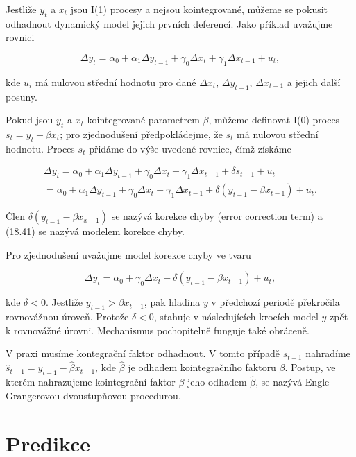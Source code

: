 Jestliže $y_t$ a $x_t$ jsou I(1) procesy a nejsou kointegrované, můžeme se pokusit odhadnout dynamický model 
jejich prvních deferencí. Jako příklad uvažujme rovnici

\begin{equation}
\Delta y_t = \alpha_0 + \alpha_1 \Delta y_{t - 1} + \gamma_0 \Delta x_t + \gamma_1 \Delta x_{t - 1} + u_t,
\end{equation}

kde $u_i$ má nulovou střední hodnotu pro dané $\Delta x_t$, $\Delta y_{t - 1}$, $\Delta x_{t - 1}$ a jejich další 
posuny.

Pokud jsou $y_t$ a $x_t$ kointegrované parametrem $\beta$, můžeme definovat I(0) proces $s_t = y_t - \beta 
x_t$; pro zjednodušení předpokládejme, že $s_t$ má nulovou střední hodnotu. Proces $s_t$ přidáme do výše 
uvedené rovnice, čímž získáme

\begin{multline}
\Delta y_t = \alpha_0 + \alpha_1 \Delta y_{t - 1} + \gamma_0 \Delta x_t + \gamma_1 \Delta x_{t - 1} + \delta s_{t - 1} 
+ u_t\\
= \alpha_0 + \alpha_1 \Delta y_{t - 1} + \gamma_0 \Delta x_t + \gamma_1 \Delta x_{t - 1} + \delta(y_{t - 1} - \beta 
x_{t - 1}) + u_t.
\end{multline}

Člen $\delta(y_{t - 1} - \beta x_{x - 1})$ se nazývá korekce chyby (error correction term) a (18.41) se nazývá 
modelem korekce chyby.

Pro zjednodušení uvažujme model korekce chyby ve tvaru

\begin{equation}
\Delta y_t = \alpha_0 + \gamma_0 \Delta x_t + \delta(y_{t - 1} - \beta x_{t - 1}) + u_t,
\end{equation}

kde $\delta < 0$. Jestliže $y_{t - 1} > \beta x_{t - 1}$, pak hladina $y$ v předchozí periodě překročila 
rovnovážnou úroveň. Protože $\delta <0$, stahuje v následujících krocích model $y$ zpět k rovnovážné 
úrovni. Mechanismus pochopitelně funguje také obráceně.

V praxi musíme kontegrační faktor odhadnout. V tomto případě $s_{t - 1}$ nahradíme $\hat{s}_{t - 1} = y_{t - 1} 
- \hat{\beta} x_{t - 1}$, kde $\hat{\beta}$ je odhadem kointegračního faktoru $\beta$. Postup, ve kterém 
nahrazujeme kointegrační faktor $\beta$ jeho odhadem $\hat{\beta}$, se nazývá Engle-Grangerovou dvoustupňovou 
procedurou.

\section{Predikce}

